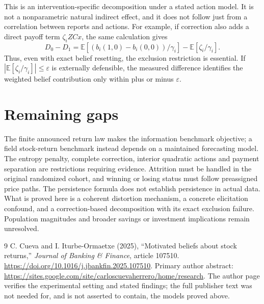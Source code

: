 \documentclass[11pt,a4paper]{article}
\theoremstyle{definition}
\theoremstyle{remark}
\newcommand{\E}{\mathbb E}
\begin{document}
This is an intervention-specific decomposition under a stated action model. It is not a nonparametric natural indirect effect, and it does not follow just from a correlation between reports and actions. For example, if correction also adds a direct payoff term $\zeta_i ZC x$, the same calculation gives
\[
 D_0-D_1=\E[(b_i(1,0)-b_i(0,0))/\gamma_i]
                   -\E[\zeta_i/\gamma_i].
\]
Thus, even with exact belief resetting, the exclusion restriction is essential. If $|\E[\zeta_i/\gamma_i]|\leq\varepsilon$ is externally defensible, the measured difference identifies the weighted belief contribution only within plus or minus $\varepsilon$.

\section{Remaining gaps}
The finite announced return law makes the information benchmark objective; a field stock-return benchmark instead depends on a maintained forecasting model. The entropy penalty, complete correction, interior quadratic actions and payment separation are restrictions requiring evidence. Attrition must be handled in the original randomized cohort, and winning or losing status must follow preassigned price paths. The persistence formula does not establish persistence in actual data. What is proved here is a coherent distortion mechanism, a concrete elicitation confound, and a correction-based decomposition with its exact exclusion failure. Population magnitudes and broader savings or investment implications remain unresolved.

\begin{thebibliography}{9}
 C. Cueva and I. Iturbe-Ormaetxe (2025), ``Motivated beliefs about stock returns,'' \emph{Journal of Banking \& Finance}, article 107510. \url{https://doi.org/10.1016/j.jbankfin.2025.107510}. Primary author abstract: \url{https://sites.google.com/site/carloscuevaherrero/home/research}. The author page verifies the experimental setting and stated findings; the full publisher text was not needed for, and is not asserted to contain, the models proved above.
\end{thebibliography}
\end{document}

